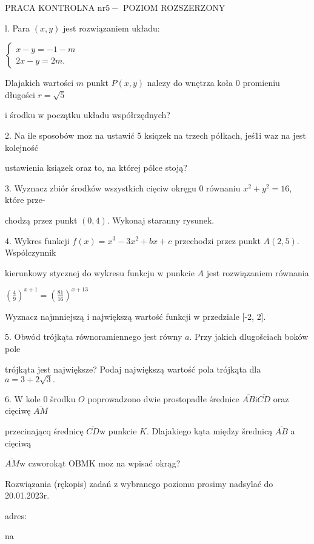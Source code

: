 \documentclass[a4paper,12pt]{article}
\begin{document}
PRACA KONTROLNA $\mathrm{n}\mathrm{r} 5-$ POZIOM ROZSZERZONY

l. Para $(x,y)$ jest rozwiązaniem układu:

$\left\{\begin{array}{l}
x-y=-1-m\\
2x-y=2m.
\end{array}\right.$

Dlajakich wartości $m$ punkt $P(x,y)$ nalezy do wnętrza koła $0$ promieniu długości $r=\sqrt{5}$

$\mathrm{i}$ środku $\mathrm{w}$ początku układu współrzędnych?

2. Na ile sposobów $\mathrm{m}\mathrm{o}\dot{\mathrm{z}}$ na ustawić 5 ksiqzek na trzech półkach, jeś1i $\mathrm{w}\mathrm{a}\dot{\mathrm{z}}$ na jest kolejność

ustawienia ksiązek oraz to, na której pólce stoją?

3. Wyznacz zbiór środków wszystkich cięciw okręgu $0$ równaniu $x^{2}+y^{2}=16$, które prze-

chodzą przez punkt $(0,4)$. Wykonaj staranny rysunek.

4. Wykres funkcji $f(x)=x^{3}-3x^{2}+bx+c$ przechodzi przez punkt $A(2,5)$. Wspólczynnik

kierunkowy stycznej do wykresu funkcju $\mathrm{w}$ punkcie $A$ jest rozwiązaniem równania

$(\displaystyle \frac{4}{9})^{x+1}=(\frac{81}{16})^{x+13}$

Wyznacz najmniejszą $\mathrm{i}$ największą wartość funkcji $\mathrm{w}$ przedziale [-2, 2].

5. Obwód trójkąta równoramiennego jest równy $a$. Przy jakich dlugošciach boków pole

trójkąta jest największe? Podaj największą wartość pola trójkąta dla $a=3+2\sqrt{3}.$

6. $\mathrm{W}$ kole $0$ šrodku $O$ poprowadzono dwie prostopadłe średnice $\overline{AB}\mathrm{i}\overline{CD}$ oraz cięciwę $\overline{AM}$

przecinającq średnicę $\overline{CD}\mathrm{w}$ punkcie $K$. Dlajakiego kąta między šrednicą $\overline{AB}$ a cięciwą

$\overline{AM}\mathrm{w}$ czworokąt OBMK $\mathrm{m}\mathrm{o}\dot{\mathrm{z}}$ na wpisać okrąg?

Rozwiązania (rękopis) zadań z wybranego poziomu prosimy nadsylać do 20.01.2023r.

adres:

na
\end{document}
